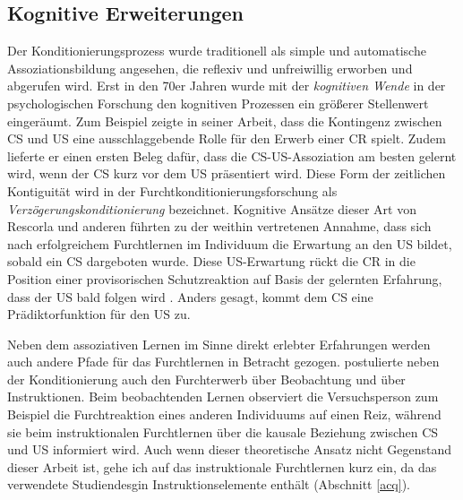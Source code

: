 	\subsection{Kognitive Erweiterungen}	\label{cognitive}

		Der Konditionierungsprozess wurde traditionell als simple und automatische Assoziationsbildung angesehen, die reflexiv und unfreiwillig erworben und abgerufen wird. Erst in den 70er Jahren wurde mit der \textit{kognitiven Wende} in der psychologischen Forschung den kognitiven Prozessen ein größerer Stellenwert eingeräumt. 
		Zum Beispiel zeigte \textcite{RESCORLA1968} in seiner Arbeit, dass die Kontingenz zwischen CS und US eine ausschlaggebende Rolle für den Erwerb einer CR spielt. Zudem lieferte er einen ersten Beleg dafür, dass die CS-US-Assoziation am besten gelernt wird, wenn der CS kurz vor dem US präsentiert wird. Diese Form der zeitlichen Kontiguität wird in der Furchtkonditionierungsforschung als \textit{Verzögerungskonditionierung} bezeichnet.
		Kognitive Ansätze dieser Art von Rescorla und anderen führten zu der weithin vertretenen Annahme, dass sich nach erfolgreichem Furchtlernen im Individuum die Erwartung an den US bildet, sobald ein CS dargeboten wurde. Diese US-Erwartung rückt die CR in die Position einer provisorischen Schutzreaktion auf Basis der gelernten Erfahrung, dass der US bald folgen wird \parencite{KIESEL2012}. Anders gesagt, kommt dem CS eine Prädiktorfunktion für den US zu. 
			
		Neben dem assoziativen Lernen im Sinne direkt erlebter Erfahrungen werden auch andere Pfade für das Furchtlernen in Betracht gezogen. \textcite {RACHMAN1977} postulierte neben der Konditionierung auch den Furchterwerb über Beobachtung und über Instruktionen. Beim beobachtenden Lernen observiert die Versuchsperson zum Beispiel die Furchtreaktion eines anderen Individuums auf einen Reiz, während sie beim instruktionalen Furchtlernen über die kausale Beziehung zwischen CS und US informiert wird. 
		Auch wenn dieser theoretische Ansatz nicht Gegenstand dieser Arbeit ist, gehe ich auf das instruktionale Furchtlernen kurz ein, da das verwendete Studiendesgin Instruktionselemente enthält (Abschnitt \ref{acq}).
		
